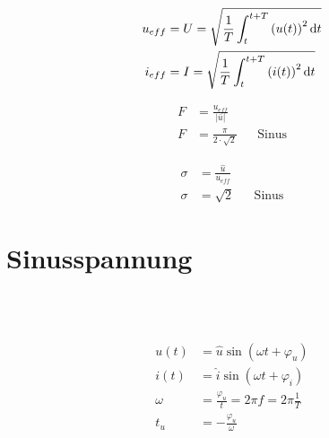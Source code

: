 \begin{boxleft}
\end{boxleft}\begin{boxrightshaded}
\begin{align*}
u_{eff}&=U=\sqrt{\frac{1}{T}\int_t^{t+T}\left(u(t)\right)^2\mathop{}\!\mathrm{d} t}\\
i_{eff}&=I=\sqrt{\frac{1}{T}\int_t^{t+T}\left(i(t)\right)^2\mathop{}\!\mathrm{d} t}
\end{align*}
\end{boxrightshaded}

\begin{boxleft}
\end{boxleft}\begin{boxrightshaded}
\begin{align*}
F&=\frac{u_{eff}}{\left|\bar{u}\right|}\\
F&=\frac{\pi}{2\cdot\sqrt{2}}&&\text{Sinus}
\end{align*}
\end{boxrightshaded}

\begin{boxleft}
\end{boxleft}\begin{boxrightshaded}
\begin{align*}
\sigma&=\frac{\hat{u}}{u_{eff}}\\
\sigma&=\sqrt{2} && \text{Sinus}
\end{align*}
\end{boxrightshaded}


\section{Sinusspannung}

\begin{boxleft}
\\
\\
\end{boxleft}\begin{boxrightshaded}
\begin{align*}
u(t)&=\hat{u}\sin{\left(\omega t+\varphi_u\right)}\\
i(t)&=\hat{i}\sin{\left(\omega t+\varphi_i\right)}\\
\omega&=\frac{\varphi_u}{t}=2\pi f =2\pi\frac{1}{T}\\
t_u&=-\frac{\varphi_u}{\omega}
\end{align*}
\end{boxrightshaded}

